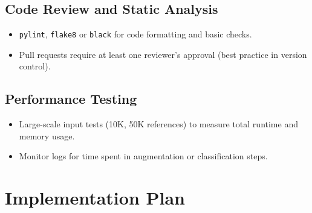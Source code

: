 \documentclass[12pt]{article}
\begin{document}
\subsection{Code Review and Static Analysis}
\begin{itemize}
  \item \texttt{pylint}, \texttt{flake8} or \texttt{black} for code formatting and basic checks.
  \item Pull requests require at least one reviewer’s approval (best practice in version control).
\end{itemize}

\subsection{Performance Testing}
\begin{itemize}
  \item Large-scale input tests (10K, 50K references) to measure total runtime and memory usage.
  \item Monitor logs for time spent in augmentation or classification steps.
\end{itemize}

\section{Implementation Plan}
\end{document}
